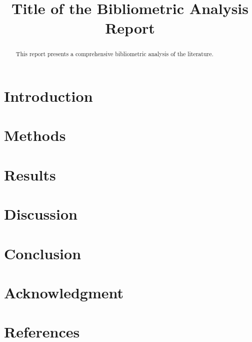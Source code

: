 \documentclass[conference]{IEEEtran}
\begin{document}
\title{Title of the Bibliometric Analysis Report}

\author{
}

\maketitle

\begin{abstract}
This report presents a comprehensive bibliometric analysis of the literature.
\end{abstract}

\section{Introduction}

\section{Methods}

\section{Results}

\section{Discussion}

\section{Conclusion}

\section*{Acknowledgment}

\section*{References}
\end{document}
